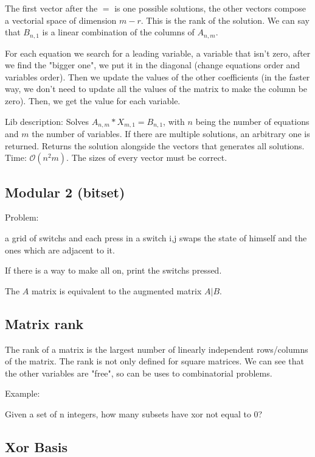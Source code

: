     The first vector after the $=$ is one possible solutions, the other vectors compose a vectorial space of dimension $m-r$. This is the rank of the solution. We can say that $B_{n,1}$ is a linear combination of the columns of $A_{n,m}$.

    For each equation we search for a leading variable, a variable that isn't zero, after we find the "bigger one", we put it in the diagonal (change equations order and variables order). Then we update the values of the other coefficients (in the faster way, we don't need to update all the values of the matrix to make the column be zero). Then, we get the value for each variable.

    Lib description: Solves $A_{n,m} * X_{m,1} = B_{n,1}$, with $n$ being the number of equations and $m$ the number of variables. If there are multiple solutions, an arbitrary one is returned. Returns the solution alongside the vectors that generates all solutions. Time: $\mathcal{O}(n^2 m)$. The sizes of every vector must be correct.

    \subsection{Modular 2 (bitset)}
    Problem:
    
    a grid of switchs and each press in a switch i,j swaps the state of himself and the ones which are adjacent to it.
    
    If there is a way to make all on, print the switchs pressed.

    The $A$ matrix is equivalent to the augmented matrix $A|B$.
    
    \subsection{Matrix rank}
    The rank of a matrix is the largest number of linearly independent rows/columns of the matrix. The rank is not only defined for square matrices.
    We can see that the other variables are "free", so can be uses to combinatorial problems.
    
    Example:
    
    Given a set of n integers, how many subsets have xor not equal to 0?

    \subsection{Xor Basis}

